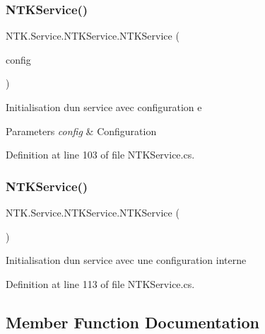 \subsubsection{\texorpdfstring{NTKService()}{NTKService()}\hspace{0.1cm}{\footnotesize\ttfamily [2/3]}}
{\footnotesize\ttfamily N\+T\+K.\+Service.\+N\+T\+K\+Service.\+N\+T\+K\+Service (\begin{DoxyParamCaption}\item[{\mbox{\hyperlink{struct_n_t_k_1_1_service_1_1_service_config}{Service\+Config}}}]{config }\end{DoxyParamCaption})}



Initialisation d\textquotesingle{}un service avec configuration e 


\begin{DoxyParams}{Parameters}
{\em config} & Configuration\\
\hline
\end{DoxyParams}


Definition at line 103 of file N\+T\+K\+Service.\+cs.

\mbox{\label{class_n_t_k_1_1_service_1_1_n_t_k_service_ae68f898da08a9d9916b23c106474cae8}} 
\subsubsection{\texorpdfstring{NTKService()}{NTKService()}\hspace{0.1cm}{\footnotesize\ttfamily [3/3]}}
{\footnotesize\ttfamily N\+T\+K.\+Service.\+N\+T\+K\+Service.\+N\+T\+K\+Service (\begin{DoxyParamCaption}{ }\end{DoxyParamCaption})}



Initialisation d\textquotesingle{}un service avec une configuration interne 



Definition at line 113 of file N\+T\+K\+Service.\+cs.



\subsection{Member Function Documentation}
\mbox{\label{class_n_t_k_1_1_service_1_1_n_t_k_service_a8c2fd33b41da5a4edf9911682dfd36cd}} 
